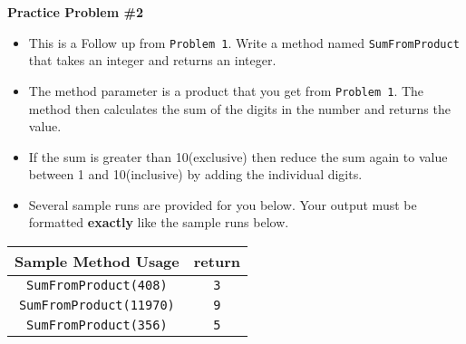 \documentclass[12pt]{article}
\begin{document}
\noindent\textbf{Practice Problem \#2}
\begin{itemize}
	\item This is a Follow up from \texttt{Problem 1}. Write a method named \texttt{SumFromProduct} that takes an integer and returns an integer.
	\item The method parameter is a product that you get from \texttt{Problem 1}. The method then calculates the sum of the digits in the number and returns the value.
	\item If the sum is greater than 10(exclusive) then reduce the sum again to value between 1 and 10(inclusive) by adding the individual digits.
	\item Several sample runs are provided for you below. Your output must be formatted \textbf{exactly} like the sample runs below.
\end{itemize}
\begin{center}
\begin{tabular}{| c | c |}
\hline\rule{0pt}{4ex}
Sample Method Usage & return \\
\hline\rule{0pt}{4ex}
\texttt{SumFromProduct(408)} & \texttt{3}\\
\hline\rule{0pt}{4ex}
\texttt{SumFromProduct(11970)} & \texttt{9}\\
\hline\rule{0pt}{4ex}
\texttt{SumFromProduct(356)} & \texttt{5}\\
\hline
\end{tabular}
\end{center}
	
\end{document}
